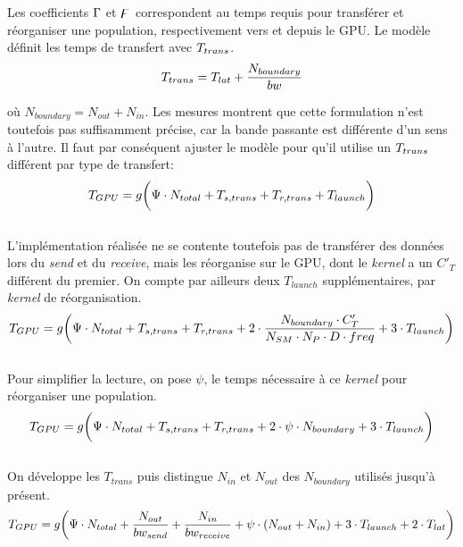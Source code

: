 Les coefficients  $\Gamma$ et $\digamma$ correspondent au temps requis pour transférer et réorganiser une population, respectivement vers et depuis le \acs{GPU}. Le modèle définit les temps de transfert avec $T_{trans}$.
\begin{equation}
T_{trans} = T_{lat}+ \frac{N_{boundary}}{bw}
\end{equation}

où $N_{boundary} = N_{out} +  N_{in}$. Les mesures montrent que cette formulation n'est toutefois pas suffisamment précise, car la bande passante est différente d'un sens à l'autre. Il faut par conséquent ajuster le modèle pour qu'il utilise un $T_{trans}$ différent par type de transfert:
\begin{equation}
T_{GPU} = g \bigg( \Psi \cdot N_{total} + T_{s,trans} + T_{r,trans} + T_{launch}  \bigg)
\end{equation}\\[-\baselineskip]

L'implémentation réalisée ne se contente toutefois pas de transférer des données lors du \textit{send} et du \textit{receive}, mais les réorganise sur le \acs{GPU}, dont le \textit{kernel} a un $C'_T$ différent du premier. On compte par ailleurs deux $T_{launch}$ supplémentaires, par \textit{kernel} de réorganisation.
\begin{equation}
T_{GPU} = g \bigg( \Psi \cdot N_{total} + T_{s,trans} + T_{r,trans} + 2\cdot\frac{N_{boundary}\cdot C'_T}{N_{SM}\cdot N_P \cdot D \cdot freq} + 3\cdot T_{launch}  \bigg)
\end{equation}\\[-\baselineskip]

Pour simplifier la lecture, on pose $\psi$, le temps nécessaire à ce \textit{kernel} pour réorganiser une population.
\begin{equation}
T_{GPU} = g \bigg( \Psi \cdot N_{total}  + T_{s,trans} + T_{r,trans} + 2\cdot\psi\cdot N_{boundary} + 3\cdot T_{launch} \bigg)
\end{equation}\\[-\baselineskip]

\noindent On développe les $T_{trans}$ puis distingue $N_{in}$ et $N_{out}$ des $N_{boundary}$ utilisés jusqu'à présent.
\begin{equation}
T_{GPU} = g \bigg( \Psi \cdot N_{total}  + \frac{N_{out}}{bw_{send}} + \frac{N_{in}}{bw_{receive}} + \psi\cdot (N_{out}+N_{in}) + 3\cdot T_{launch} +2\cdot T_{lat}\bigg)
\end{equation}\\[-\baselineskip]


